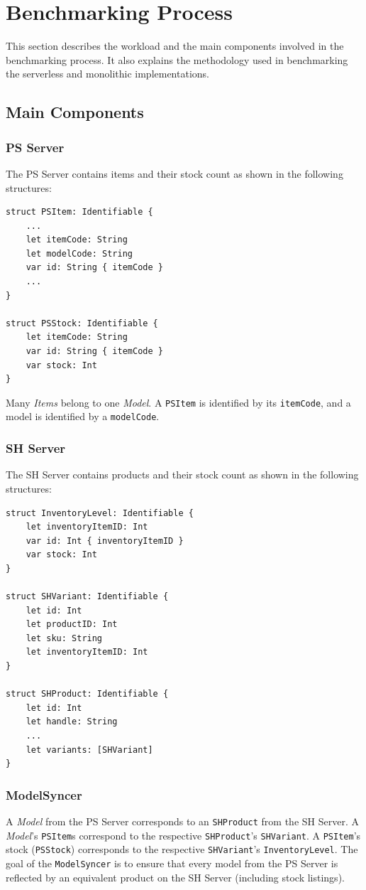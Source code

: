 \section{Benchmarking Process}

This section describes the workload and the main components involved in the benchmarking process. It also explains the methodology used in benchmarking the serverless and monolithic implementations.

\subsection{Main Components}

\subsubsection{PS Server}
The PS Server contains items and their stock count as shown in the following structures:

\begin{verbatim}
struct PSItem: Identifiable {
    ...
    let itemCode: String
    let modelCode: String
    var id: String { itemCode }
    ...
}

struct PSStock: Identifiable {
    let itemCode: String
    var id: String { itemCode }
    var stock: Int
}
\end{verbatim}

Many \textit{Items} belong to one \textit{Model}. A \texttt{PSItem} is identified by its \texttt{itemCode}, and a model is identified by a \texttt{modelCode}.

\subsubsection{SH Server}
The SH Server contains products and their stock count as shown in the following structures:

\begin{verbatim}
struct InventoryLevel: Identifiable {
    let inventoryItemID: Int
    var id: Int { inventoryItemID }
    var stock: Int
}

struct SHVariant: Identifiable {
    let id: Int
    let productID: Int
    let sku: String
    let inventoryItemID: Int
}

struct SHProduct: Identifiable {
    let id: Int
    let handle: String
    ...
    let variants: [SHVariant]
}
\end{verbatim}

\subsubsection{ModelSyncer}
A \textit{Model} from the PS Server corresponds to an \texttt{SHProduct} from the SH Server. A \textit{Model}'s \texttt{PSItem}s correspond to the respective \texttt{SHProduct}'s \texttt{SHVariant}. A \texttt{PSItem}'s stock (\texttt{PSStock}) corresponds to the respective \texttt{SHVariant}'s \texttt{InventoryLevel}. The goal of the \texttt{ModelSyncer} is to ensure that every model from the PS Server is reflected by an equivalent product on the SH Server (including stock listings).

